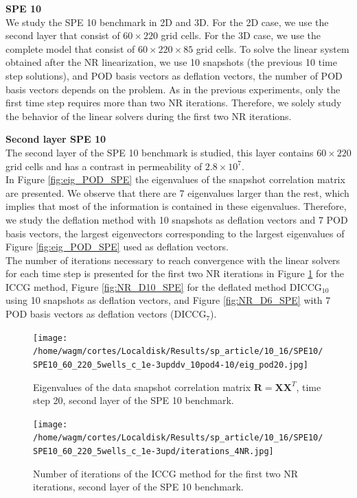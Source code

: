\documentclass[12pt]{article}
\begin{document}
\newpage
\textbf{SPE 10}\\
We study the SPE 10 benchmark in 2D and 3D. For the 2D case, we use the second layer that consist of $60\times220$ grid cells. For the 3D case, we use the complete model that consist of $60\times220\times85$ grid cells. To solve the linear system obtained after the NR linearization, we use 10 snapshots (the previous 10 time step solutions), and POD basis vectors as deflation vectors, the number of POD basis vectors depends on the problem. As in the previous experiments, only the first time step requires more than two NR iterations. Therefore, we solely study the behavior of the linear solvers during the first two NR iterations. 

\textbf{Second layer SPE 10}\\
The second layer of the SPE 10 benchmark is studied, this layer contains $60\times 220$ grid cells and has a contrast in permeability of $2.8\times 10^{7}$.\\
In Figure \ref{fig:eig_POD_SPE} the eigenvalues of the snapshot correlation matrix are presented. We observe that there are 7 eigenvalues larger than the rest, which implies that most of the information is contained in these eigenvalues. Therefore, we study the deflation method with 10 snapshots as deflation vectors and 7 POD basis vectors, the largest eigenvectors corresponding to the largest eigenvalues of Figure \ref{fig:eig_POD_SPE} used as deflation vectors. \\
The number of iterations necessary to reach convergence with the linear solvers for each time step is presented for the first two NR iterations in Figure \ref{fig:NR_IC_SPE} for the ICCG method, Figure \ref{fig:NR_D10_SPE} for the deflated method DICCG$_{10}$ using 10 snapshots as deflation vectors, and Figure \ref{fig:NR_D6_SPE} with 7 POD basis vectors as deflation vectors (DICCG$_{7}$).

\begin{figure}[!ht]
\centering
\begin{minipage}{.4\textwidth}
 \centering
\texttt{[image: /home/wagm/cortes/Localdisk/Results/sp\_article/10\_16/SPE10/SPE10\_60\_220\_5wells\_c\_1e-3upddv\_10pod4-10/eig\_pod20.jpg]}
\caption{Eigenvalues of the data snapshot correlation matrix $\mathbf{R}=\mathbf{X}\mathbf{X}^T$, time step 20, second layer of the SPE 10 benchmark.}
\label{fig:eig_POD_SPE}
\end{minipage}%
\hspace{15mm}
\begin{minipage}{.4\textwidth}
\hspace{-1cm}
\texttt{[image: /home/wagm/cortes/Localdisk/Results/sp\_article/10\_16/SPE10/SPE10\_60\_220\_5wells\_c\_1e-3upd/iterations\_4NR.jpg]}
\vspace{-2cm}
\caption{Number of iterations of the ICCG method for the first two NR iterations, second layer of the SPE 10 benchmark.}
\label{fig:NR_IC_SPE}
\end{minipage}
\end{figure}
\end{document}
